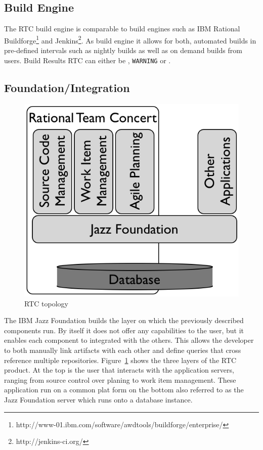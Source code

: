 \subsection{Build Engine}
The RTC build engine is comparable to build engines such as IBM Rational Buildforge\footnote{http://www-01.ibm.com/software/awdtools/buildforge/enterprise/} and Jenkins\footnote{http://jenkins-ci.org/}.
As build engine it allows for both, automated builds in pre-defined intervals such as nightly builds as well as on demand builds from users.
Build Results RTC can either be \error, \texttt{WARNING} or \ok. 

\subsection{Foundation/Integration}
\begin{figure}[t]
\centering
\includegraphics[width=.8\textwidth]{figures/meet-rtc.tex/rtc-topology}
\caption{RTC topology}
\label{fig:rtctopology}
\end{figure}
The IBM Jazz Foundation builds the layer on which the previously described components run.
By itself it does not offer any capabilities to the user, but it enables each component to integrated with the others. 
This allows the developer to both manually link artifacts with each other and define queries that cross reference multiple repositories.
Figure~\ref{fig:rtctopology} shows the three layers of the RTC product.
At the top is the user that interacts with the application servers, ranging from source control over planing to work item management.
These application run on a common plat form on the bottom also referred to as the Jazz Foundation server which runs onto a database instance.

